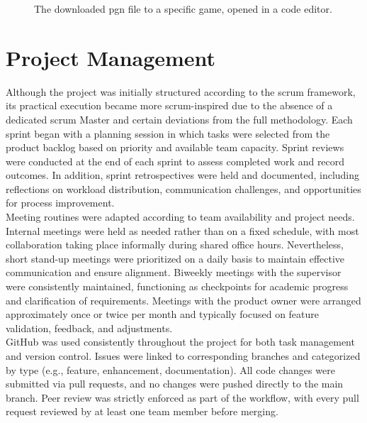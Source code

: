 \begin{figure}[h!] 
    \centering 
    \caption[PGN file and metadata]{The downloaded \gls{pgn} file to a specific game, opened in a code editor.}
    \label{fig:downloaded-pgn} 
\end{figure}

\section{Project Management}
\label{sec:results-project-management}
Although the project was initially structured according to the \gls{scrum} framework, its practical execution became more \gls{scrum}-inspired due to the absence of a dedicated \gls{scrum} Master and certain deviations from the full methodology. Each sprint began with a planning session in which tasks were selected from the product backlog based on priority and available team capacity. Sprint reviews were conducted at the end of each sprint to assess completed work and record outcomes. In addition, sprint retrospectives were held and documented, including reflections on workload distribution, communication challenges, and opportunities for process improvement. \\

Meeting routines were adapted according to team availability and project needs. Internal meetings were held as needed rather than on a fixed schedule, with most collaboration taking place informally during shared office hours. Nevertheless, short stand-up meetings were prioritized on a daily basis to maintain effective communication and ensure alignment. Biweekly meetings with the supervisor were consistently maintained, functioning as checkpoints for academic progress and clarification of requirements. Meetings with the product owner were arranged approximately once or twice per month and typically focused on feature validation, feedback, and adjustments. \\

GitHub was used consistently throughout the project for both task management and version control. Issues were linked to corresponding branches and categorized by type (e.g., feature, enhancement, documentation). All code changes were submitted via pull requests, and no changes were pushed directly to the main branch. Peer review was strictly enforced as part of the workflow, with every pull request reviewed by at least one team member before merging. \\

